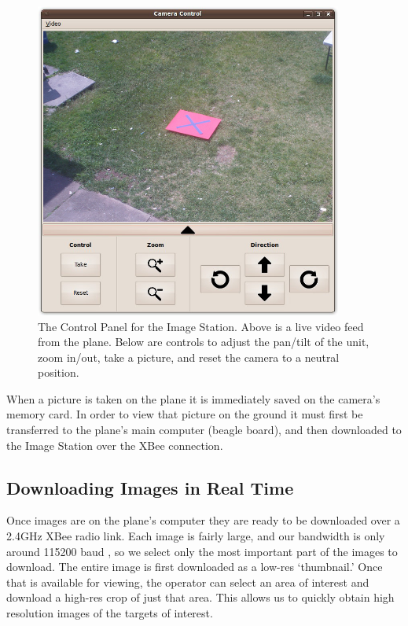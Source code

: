 \documentclass[10pt]{report}
\begin{document}
\begin{figure} [H]
  \centering
  	\includegraphics[width=0.9\textwidth]{../images/ImageStationControls.jpg}
  	\caption[Image Station Control Panel]{The Control Panel for the Image Station.  Above is a live video feed from the plane.  Below are controls to adjust the pan/tilt of the unit, zoom in/out, take a picture, and reset the camera to a neutral position.}
  	\label{fig:imagestationcontrols}
\end{figure}

When a picture is taken on the plane it is immediately saved on the camera's memory card.  In order to view that picture on the ground it must first be transferred to the plane's main computer (beagle board), and then downloaded to the Image Station over the XBee connection.

\subsection{Downloading Images in Real Time}

Once images are on the plane's computer they are ready to be downloaded over a 2.4GHz XBee radio link.  Each image is fairly large, and our bandwidth is only around 115200 baud %
, so we select only the most important part of the images to download. The entire image is first downloaded as a low-res `thumbnail.'  Once that is available for viewing, the operator can select an area of interest and download a high-res crop of just that area.  This allows us to quickly obtain high resolution images of the targets of interest.
\end{document}
